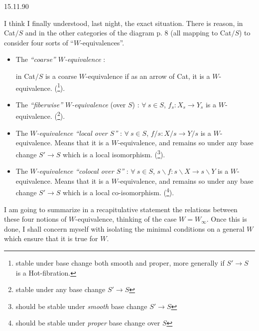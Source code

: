 

\begin{flushright}
15.11.90
\end{flushright}

I think I finally understood, last night, the exact situation. There is reason, in Cat$/S$ and in the other categories of the diagram p. 8 (all mapping to Cat$/S$) to consider four sorts of ``$W$-equivalences''. %

\begin{itemize}
\item[a)] The \textit{``coarse'' $W$-equivalence} :  in Cat$/S$ is a coarse $W$-equivalence if as an arrow of Cat, it is a $W$-equivalence. (\footnote[17]{stable under base change both smooth and proper, more generally if $S' \longrightarrow S$ is a Hot-fibration.}).

\item[b)] The \textit{``fiberwise'' $W$-equivalence} (over $S$) : $\forall\ s \in S$, $f_s : X_s \longrightarrow Y_s$ is a $W$-equivalence. (\footnote[18]{stable under any base change $S' \longrightarrow S$}). %

\item[c)] The \textit{$W$-equivalence ``local over $S$''} : $\forall\ s \in S$, $f/s : X/s \longrightarrow Y/s$ is a $W$-equivalence. Means that it is a $W$-equivalence, and remains so under any base change $S' \longrightarrow S$ which is a local isomorphism. (\footnote[19]{should be stable under \textit{smooth} base change $S' \longrightarrow S$}).

\item[c$'$)] The \textit{$W$-equivalence ``colocal over $S$''} : $\forall\ s \in S$, $s\backslash f : s\backslash X \longrightarrow s\backslash Y$ is a $W$-equivalence. Means that it is a $W$-equivalence, and remains so under any base change $S' \longrightarrow S$ which is a local co-isomorphism. (\footnote[20]{should be stable under \textit{proper} base change over $S$}).
\end{itemize}

I am going to summarize in a recapitulative statement the relations between these four notions of $W$-equivalence, thinking of the case $W = W_\infty$. Once this is done, I shall concern myself with isolating the minimal conditions on a general $W$ which ensure that it is true for $W$.

